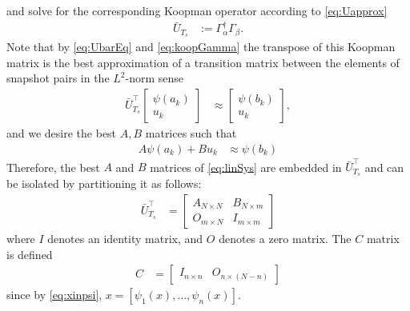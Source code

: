 and solve for the corresponding Koopman operator according to \eqref{eq:Uapprox}
\begin{align}
    \bar{U}_{T_s} &:= \Gamma_{\alpha}^\dagger \Gamma_\beta.
    \label{eq:koopGamma}
\end{align}
Note that by \eqref{eq:UbarEq} and \eqref{eq:koopGamma} the transpose of this Koopman matrix is the best approximation of a transition matrix between the elements of snapshot pairs in the $L^2$-norm sense
\begin{align}
    \bar{U}_{T_s}^\top 
    \begin{bmatrix} \psi(a_k) \\ u_k \end{bmatrix} &\approx
    \begin{bmatrix} \psi(b_k) \\ u_k \end{bmatrix},
\end{align}
and we desire the best $A,B$ matrices such that
\begin{align}
    A \psi(a_k) + B u_k &\approx \psi(b_k)
    \label{eq:linSys_psi}
\end{align}
Therefore, the best $A$ and $B$ matrices of \eqref{eq:linSys} are embedded in $\bar{U}_{T_s}^\top$ and can be isolated by partitioning it as follows:
\begin{align}
    \bar{U}_{T_s}^\top &= 
    \begin{bmatrix} 
        A_{N \times N} &
        B_{N \times m} \\
        O_{m \times N} &
        I_{m \times m}
    \end{bmatrix}
    \label{eq:AB}
\end{align}
where $I$ denotes an identity matrix, and $O$ denotes a zero matrix.
The $C$ matrix is defined
\begin{align}
    C &= \begin{bmatrix} I_{n \times n} & O_{n \times (N-n)} \end{bmatrix}
\end{align}
since by \eqref{eq:xinpsi}, ${x = [ \psi_1(x) , \dots , \psi_n(x) ]}$.




